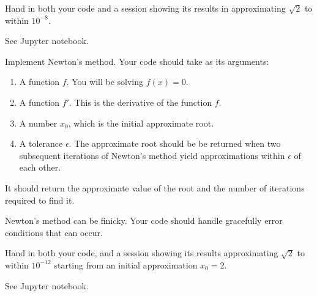 \documentclass[minion]{homework}
\begin{document}
\begin{problems}
Hand in both your code and a session showing its results in
approximating $\sqrt{2}$ to within $10^{-8}$.

\solution

See Jupyter notebook.

\problem Implement Newton's method. 
Your code should take as its arguments:
\begin{enumerate}
	\item A function $f$.  You will be solving $f(x)=0$.
	\item A function $f'$.  This is the derivative of the function $f$.
	\item A number $x_0$, which is the initial approximate root.
	\item A tolerance $\epsilon$.  The approximate root should be be returned when two subsequent iterations of Newton's method yield
	approximations within $\epsilon$ of each other.
\end{enumerate}
It should return the approximate value of the root and the number of
iterations required to find it.

Newton's method can be finicky.  Your code should handle gracefully
error conditions that can occur.

Hand in both your code, and a session showing its results 
approximating $\sqrt{2}$ to within $10^{-12}$ starting from an initial approximation $x_0=2$.

\solution

See Jupyter notebook.
\end{problems}
\end{document}
